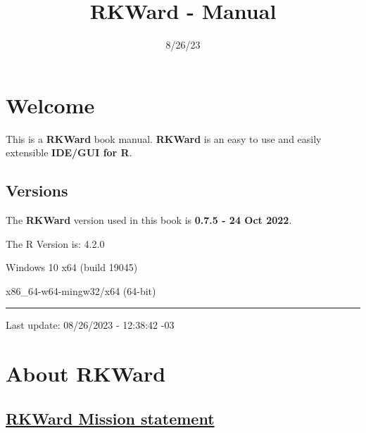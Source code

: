 \documentclass[
  letterpaper,
  DIV=11,
  numbers=noendperiod]{scrreprt}
\title{RKWard - Manual}
\author{}
\date{8/26/23}
\renewcommand*\contentsname{Table of contents}
\newcommand\contentsname{Table of contents}
\begin{document}
\maketitle
\ifdefined\Shaded\renewenvironment{Shaded}{\begin{tcolorbox}[breakable, enhanced, borderline west={3pt}{0pt}{shadecolor}, sharp corners, interior hidden, boxrule=0pt, frame hidden]}{\end{tcolorbox}}\fi

\renewcommand*\contentsname{Table of contents}
{
\hypersetup{linkcolor=}
\setcounter{tocdepth}{2}
\tableofcontents
}

\hypertarget{welcome}{%
\chapter*{Welcome}\label{welcome}}


This is a \textbf{RKWard} book manual. \textbf{RKWard} is an easy to use
and easily extensible \textbf{IDE/GUI for R}.

\hypertarget{versions}{%
\section*{Versions}\label{versions}}


The \textbf{RKWard} version used in this book is \textbf{0.7.5 - 24 Oct
2022}.

The R Version is: 4.2.0

Windows 10 x64 (build 19045)

x86\_64-w64-mingw32/x64 (64-bit)

\begin{center}\rule{0.5\linewidth}{0.5pt}\end{center}

Last update: 08/26/2023 - 12:38:42 -03


\hypertarget{about-rkward}{%
\chapter{About RKWard}\label{about-rkward}}

\hypertarget{rkward-mission-statement}{%
\section{\texorpdfstring{\href{https://rkward.kde.org/RKWard_Overview.html}{RKWard
Mission
statement}}{RKWard Mission statement}}\label{rkward-mission-statement}}
\end{document}
